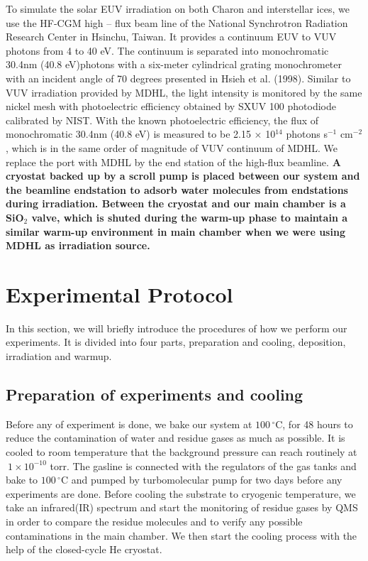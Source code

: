 To simulate the solar EUV irradiation on both Charon and interstellar ices, we use the HF-CGM high – flux beam line of the National Synchrotron Radiation Research Center in Hsinchu, Taiwan. It provides a continuum EUV to VUV photons from 4 to 40 eV. The continuum is separated into monochromatic 30.4nm (40.8 eV)photons with a six-meter cylindrical grating monochrometer with an incident angle of 70 degrees presented in Hsieh et al. (1998)\cite{hsieh1998design}. Similar to VUV irradiation provided by MDHL, the light intensity is monitored by the same nickel mesh with photoelectric efficiency obtained by SXUV 100 photodiode calibrated by NIST. With the known photoelectric efficiency, the flux of monochromatic 30.4nm (40.8 eV) is measured to be 2.15 $\times$ 10$^{14}$ photons s$^{-1}$ cm$^{-2}$, which is in the same order of magnitude of VUV continuum of MDHL. We replace the port with MDHL by the end station of the high-flux beamline. \textbf{A cryostat backed up by a scroll pump is placed between our system and the beamline endstation to adsorb water molecules from endstations during irradiation. Between the cryostat and our main chamber is a SiO$_2$ valve, which is shuted during the warm-up phase to maintain a similar warm-up environment in main chamber when we were using MDHL as irradiation source.}

\section{Experimental Protocol}
\label{sec:Experimental_Protocol}

In this section, we will briefly introduce the  procedures of how we perform our experiments. It is divided into four parts, preparation and cooling, deposition, irradiation and warmup.

\subsection{Preparation of experiments and cooling}
Before any of experiment is done, we bake our system at $100 \,^{\circ}\mathrm{C}$, for 48 hours to reduce the contamination of water and residue gases as much as possible. It is cooled to room temperature that the background pressure can reach routinely at $~ 1 \times 10^{-10}$ torr. The gasline is connected with the regulators of the gas tanks and bake to $100\,^{\circ}\mathrm{C}$ and pumped by turbomolecular pump for two days before any experiments are done. Before cooling the substrate to cryogenic temperature, we take an infrared(IR) spectrum and start the monitoring of residue gases by QMS in order to compare the residue molecules and to verify any possible contaminations in the main chamber. We then start the cooling process with the help of the closed-cycle He cryostat.

